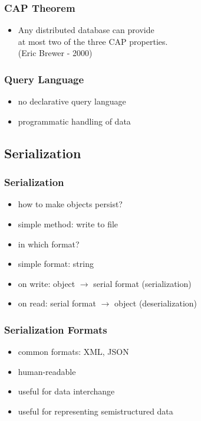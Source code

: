 \documentclass[dvipsnames]{beamer}
\theoremstyle{plain}
\begin{document}
\begin{frame}
  \frametitle{CAP Theorem}

  \begin{itemize}
    \item Any distributed database can provide\\
      at most two of the three CAP properties.\\
      (Eric Brewer - 2000)
  \end{itemize}
\end{frame}

\begin{frame}
  \frametitle{Query Language}

  \begin{itemize}
    \item no declarative query language
    \item programmatic handling of data
  \end{itemize}
\end{frame}

\subsection{Serialization}

\begin{frame}
  \frametitle{Serialization}

  \begin{itemize}
    \item how to make objects persist?
    \item simple method: write to file
    \item in which format?
    \item simple format: string

    \pause
    \medskip
    \item on write: object $\rightarrow$ serial format (\alert{serialization})
    \item on read: serial format $\rightarrow$ object (deserialization)
  \end{itemize}
\end{frame}

\begin{frame}
  \frametitle{Serialization Formats}

  \begin{itemize}
    \item common formats: XML, JSON

    \smallskip
    \item human-readable
    \item useful for data interchange
    \item useful for representing semistructured data
  \end{itemize}
\end{frame}
\end{document}
